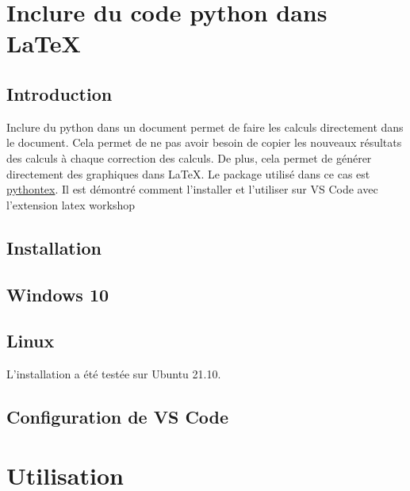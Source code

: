\section{Inclure du code python dans \LaTeX}
\subsection{Introduction}
Inclure du python dans un document permet de faire les calculs directement dans le document.
Cela permet de ne pas avoir besoin de copier les nouveaux résultats des calculs à chaque correction des calculs.
De plus, cela permet de générer directement des graphiques dans \LaTeX.
Le package utilisé dans ce cas est \href{https://www.ctan.org/pkg/pythontex}{pythontex}.
Il est démontré comment l'installer et l'utiliser sur VS Code avec l'extension latex workshop

\subsection{Installation}
\subsection{Windows 10}

\subsection{Linux}
L'installation a été testée sur Ubuntu 21.10.

\subsection{Configuration de VS Code}

\section{Utilisation}